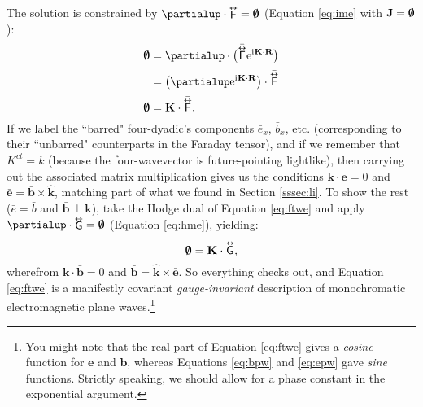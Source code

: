 \documentclass[12pt]{article}
\renewcommand{\vv}[1]{\mathbf{#1}}
\newcommand{\tightoverset}[2]{%
  \mathop{#2}\limits^{\vbox to -.5ex{\kern-0.75ex\hbox{$#1$}\vss}}}
\newcommand{\inlinedy}[1]{\tightoverset{\text{\tiny$\bm\leftrightarrow$}}{#1}}
\newcommand{\capdy}[1]{ \overset{ \text{\tiny$\bm\leftrightarrow$} }{\vphantom{\text{\small{A}}}\smash{#1}} }
\begin{document}
The solution is constrained by $\partialup \cdot \inlinedy{\mathsf{F}} = \textrm{\mbox{\boldmath $\emptyset$}}$ (Equation \ref{eq:ime} with $\vv J = \textrm{\mbox{\boldmath $\emptyset$}}$):
\begin{equation*}
\begin{split}
\textrm{\mbox{\boldmath $\emptyset$}} &= \partialup \cdot \bigl( \bar{\capdy{\mathsf{F}}} \mathrm{e}^{\mathrm{i} \mkern.5mu \vv K \cdot \vv R} \bigr) \\[2pt]
&= \left( \partialup \mathrm{e}^{\mathrm{i} \mkern.5mu \vv K \cdot \vv R} \right) \cdot \bar{\capdy{\mathsf{F}}} \\[2pt]
\textrm{\mbox{\boldmath $\emptyset$}} &= \vv K \cdot \bar{\capdy{\mathsf{F}}} .
\end{split}
\end{equation*}
If we label the ``barred" four-dyadic's components $\bar{e}_x$, $\bar{b}_x$, etc. (corresponding to their ``unbarred" counterparts in the Faraday tensor), and if we remember that $K^{ct} = k$ (because the four-wavevector is future-pointing lightlike), then carrying out the associated matrix multiplication gives us the conditions $\vv k \cdot \bar{\vv e} = 0$ and ${\bar{\vv e} = \bar{\vv b} \times \vv{\hat k}}$, matching part of what we found in Section \ref{sssec:li}. To show the rest ($\bar{e} = \bar{b}$ and $\bar{\vv b} \perp \vv k$), take the Hodge dual of Equation \ref{eq:ftwe} and apply $\partialup \cdot \inlinedy{\mathsf{G}} = \textrm{\mbox{\boldmath $\emptyset$}}$ (Equation \ref{eq:hme}), yielding:
\begin{equation*}
\textrm{\mbox{\boldmath $\emptyset$}} = \vv K \cdot \bar{\capdy{\mathsf{G}}} ,
\end{equation*}
wherefrom $\vv k \cdot \bar{\vv b} = 0$ and ${\bar{\vv b} = \vv{\hat k}} \times \bar{\vv e}$. So everything checks out, and Equation \ref{eq:ftwe} is a manifestly covariant \emph{gauge-invariant} description of monochromatic electromagnetic plane waves.\footnote{You might note that the real part of Equation \ref{eq:ftwe} gives a \emph{cosine} function for $\vv e$ and $\vv b$, whereas Equations \ref{eq:bpw} and \ref{eq:epw} gave \emph{sine} functions. Strictly speaking, we should allow for a phase constant in the exponential argument.}
\end{document}
